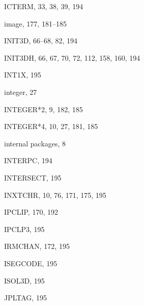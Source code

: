 \begin{theindex}
  \item ICTERM, 33, 38, 39, 194
  \item image, 177, 181--185
  \item INIT3D, 66--68, 82, 194
  \item INIT3DH, 66, 67, 70, 72, 112, 158, 160, 194
  \item INT1X, 195
  \item integer, 27
  \item INTEGER*2, 9, 182, 185
  \item INTEGER*4, 10, 27, 181, 185
  \item internal packages, 8
  \item INTERPC, 194
  \item INTERSECT, 195
  \item INXTCHR, 10, 76, 171, 175, 195
  \item IPCLIP, 170, 192
  \item IPCLP3, 195
  \item IRMCHAN, 172, 195
  \item ISEGCODE, 195
  \item ISOL3D, 195

  \indexspace

  \item JPLTAG, 195

  \indexspace


\end{theindex}
